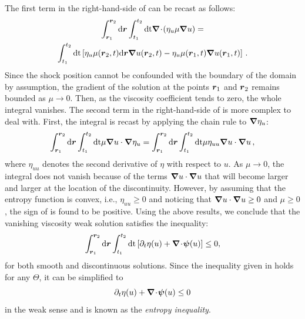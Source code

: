 %
The first term in the right-hand-side of  can be recast as follows:
%
\begin{multline}\label{eq:weak_sol11_sct1b}
\int_{\boldsymbol r_1}^{\boldsymbol r_2}\text{d} \boldsymbol r \int_{t_1}^{t_2} \text{dt} \boldsymbol{\nabla}\! \cdot \! \left( \eta_u \mu \boldsymbol{\nabla} u \right) = \\
\int_{t_1}^{t_2} \text{dt} \left[ \eta_u \mu(\boldsymbol r_2,t )\text{d} \boldsymbol r \boldsymbol{\nabla} u( \boldsymbol r_2,t) - \eta_u \mu(\boldsymbol r_1,t ) \boldsymbol{\nabla} u( \boldsymbol r_1,t) \right] \,.
\end{multline}
%
Since the shock position cannot be confounded with the boundary of the domain by assumption, the gradient of the solution at the points $\boldsymbol r_1$ and $\boldsymbol r_2$ remains bounded as $\mu \to 0$. Then, as the viscosity coefficient tends to zero, the whole integral vanishes. The second term in the right-hand-side of  is more complex to deal with. First, the integral is recast by applying the chain rule to $\boldsymbol{\nabla} \eta_u$:
%
\begin{equation}\label{eq:weak_sol12_sct1b}
\int_{\boldsymbol r_1}^{\boldsymbol r_2}\text{d} \boldsymbol r \int_{t_1}^{t_2}\text{dt} \mu \boldsymbol{\nabla} u \cdot \boldsymbol{\nabla} \eta_u = \int_{\boldsymbol r_1}^{\boldsymbol r_2}\text{d} \boldsymbol r \int_{t_1}^{t_2}\text{dt} \mu\eta_{uu} \boldsymbol{\nabla} u \cdot \boldsymbol{\nabla} u \,,
\end{equation}
%
where $\eta_{uu}$ denotes the second derivative of $\eta$ with respect to $u$. As $\mu \to 0$, the integral does not vanish because of the terms $\boldsymbol{\nabla} u \cdot \boldsymbol{\nabla} u$ that will become larger and larger at the location of the discontinuity. However, by assuming that the entropy function is convex, i.e., $\eta_{uu} \geq 0$ and noticing that $\boldsymbol{\nabla} u \cdot \boldsymbol{\nabla} u \geq 0$ and $\mu \geq 0$, the sign of  is found to be positive. Using the above results, we conclude that the vanishing viscosity weak solution satisfies the inequality:
%
\begin{equation}\label{eq:weak_sol13_sct1b}
\int_{\boldsymbol r_1}^{\boldsymbol r_2}\text{d} \boldsymbol r \int_{t_1}^{t_2}\text{dt} \left[ \partial_t \eta (u) + \boldsymbol{\nabla}\! \cdot \! \boldsymbol\psi (u) \right] \leq 0,
\end{equation}
% 
for both smooth and discontinuous solutions.  Since the inequality given in  holds for any $\Theta$, it can be simplified to
%
\begin{equation}\label{eq:weak_sol14_sct1b}
\partial_t \eta (u) + \boldsymbol{\nabla}\! \cdot \! \boldsymbol\psi (u) \leq 0
\end{equation}
%
in the weak sense and is known as the \emph{entropy inequality}. 
